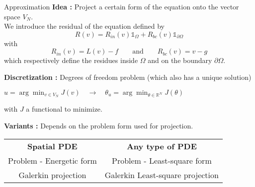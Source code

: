 \begin{frame}{Approximation}
	\textbf{Idea :} Project a certain form of the equation onto the vector space $V_N$. \\
	We introduce the residual of the equation defined by
	\begin{equation*}
		R(v) = R_{in}(v)\mathds{1}_{\Omega} + R_{bc}(v)\mathds{1}_{\partial \Omega}
	\end{equation*}
	with 
	\begin{equation*}
		R_{in}(v)=L(v) - f \qquad \text{and} \qquad R_{bc}(v)=v-g
	\end{equation*}
	which respectively define the residues inside $\Omega$ and on the boundary $\partial\Omega$. 
	
	\vspace{5pt}
	
	\textbf{Discretization :} Degrees of freedom problem (which also has a unique solution)
	\begin{center}
		$u=\arg\min_{v\in V_N} J(v) \quad \longrightarrow \quad \theta_u=\arg\min_{\theta\in \mathbb{R}^N} J(\theta) $
	\end{center}
	with $J$ a functional to minimize.
	
	\vspace{5pt}
	
	\textbf{Variants :} Depends on the problem form used for projection.
	
	\begin{center}
		\begin{tabular}{c|c}
			\textbf{Spatial PDE} & \textbf{Any type of PDE} \\
			Problem - Energetic form & Problem - Least-square form \\
			Galerkin projection & Galerkin Least-square projection
		\end{tabular}
	\end{center}
\end{frame}

